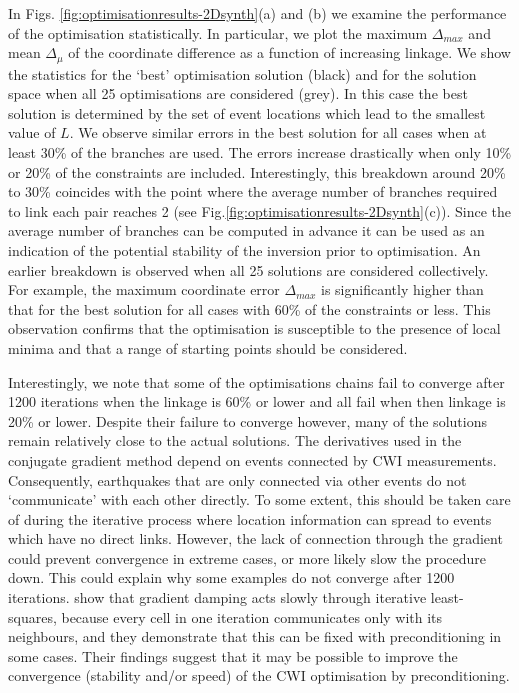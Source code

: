 \documentclass[extra]{gji}
\begin{document}
In Figs. \ref{fig:optimisationresults-2Dsynth}(a) and (b) we examine
the performance of the optimisation statistically. In particular, we
plot the maximum $\Delta_{max}$ and mean $\Delta_\mu$ of the
coordinate difference as a function of increasing linkage. We show
the statistics for the `best' optimisation solution (black) and for
the solution space when all 25 optimisations are considered (grey).
In this case the best solution is determined by the set of event
locations which lead to the smallest value of $L$. We observe
similar errors in the best solution for all cases when at least 30\%
of the branches are used. The errors increase drastically when only
10\% or 20\% of the constraints are included. Interestingly, this
breakdown around 20\% to 30\% coincides with the point where the
average number of branches required to link each pair reaches 2 (see
Fig.\ref{fig:optimisationresults-2Dsynth}(c)). Since the average
number of branches can be computed in advance it can be used as an
indication of the potential stability of the inversion prior to
optimisation. An earlier breakdown is observed when all 25 solutions
are considered collectively. For example, the maximum coordinate
error $\Delta_{max}$ is significantly higher than that for the best
solution for all cases with 60\% of the constraints or less. This
observation confirms that the optimisation is susceptible to the
presence of local minima and that a range of starting points should
be considered.

Interestingly, we note that some of the optimisations chains
fail to converge after 1200 iterations when the linkage is 60\% or lower and all
fail when then linkage is 20\% or lower. Despite their failure to converge however, many of the
solutions remain relatively close to the actual solutions. The derivatives used in the conjugate gradient method
depend on events connected by CWI measurements. Consequently,
earthquakes that are only connected via other events do not `communicate' with each other
directly. To some extent, this should be taken care of during the iterative process where location information
can spread to events which have no direct links. However, the
lack of connection through the gradient could prevent convergence in extreme cases, or more likely
slow the procedure down. This could explain why some
examples do not converge after 1200 iterations.
\citet{dr_VanDecar94a} show that gradient damping acts
slowly through iterative least-squares, because
 every cell in one iteration communicates only with its neighbours, and they demonstrate that this can be
fixed with preconditioning in some cases. Their findings suggest that it may be possible to improve
the convergence (stability and/or speed) of the CWI optimisation by preconditioning.
\end{document}
